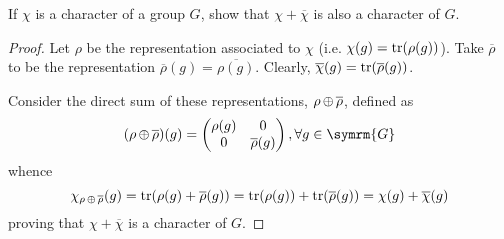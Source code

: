 \begin{exercise}
If \(\chi\) is a character of a group \(G\), show that \(\chi + \overline{\chi}\) is also a character of \(G\).
\end{exercise}
\begin{proof}
Let \(\rho\) be the representation associated to \(\chi\) (i.e. \(\chi(g) = \operatorname*{tr}(\rho(g))\)). Take \(\overline{\rho}\) to be the representation \(\overline{\rho}(g) = \overline{\rho(g)}\). Clearly, \(\overline{\chi}(g) = \operatorname*{tr}(\overline{\rho}(g))\).

Consider the direct sum of these representations, \(\rho \operatorname*{\oplus} \overline{\rho}\), defined as
\[
    (\rho \directsum \overline{\rho})(g) = \begin{pmatrix}
        \rho(g) & 0 \\
        0 & \overline{\rho}(g)
    \end{pmatrix}, \forall g \in \symrm{G}
\]
whence
\[
    \chi_{\rho \operatorname*{\oplus} \overline{\rho}}(g) = \operatorname*{tr}(\rho(g) + \overline{\rho}(g)) = \operatorname*{tr}(\rho(g)) + \operatorname*{tr}(\overline{\rho}(g)) = \chi(g) + \overline{\chi}(g)
\]
proving that \(\chi + \overline{\chi}\) is a character of \(G\).
\end{proof}